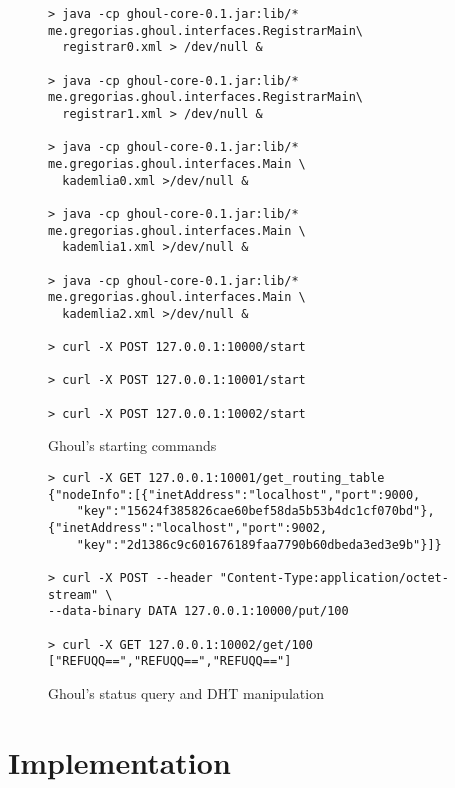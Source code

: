 \begin{figure}[tbp]
\begin{verbatim}
> java -cp ghoul-core-0.1.jar:lib/* me.gregorias.ghoul.interfaces.RegistrarMain\
  registrar0.xml > /dev/null &

> java -cp ghoul-core-0.1.jar:lib/* me.gregorias.ghoul.interfaces.RegistrarMain\
  registrar1.xml > /dev/null &

> java -cp ghoul-core-0.1.jar:lib/* me.gregorias.ghoul.interfaces.Main \ 
  kademlia0.xml >/dev/null &

> java -cp ghoul-core-0.1.jar:lib/* me.gregorias.ghoul.interfaces.Main \ 
  kademlia1.xml >/dev/null &

> java -cp ghoul-core-0.1.jar:lib/* me.gregorias.ghoul.interfaces.Main \ 
  kademlia2.xml >/dev/null &

> curl -X POST 127.0.0.1:10000/start

> curl -X POST 127.0.0.1:10001/start

> curl -X POST 127.0.0.1:10002/start
\end{verbatim}
\caption{Ghoul's starting commands}
\label{fig:ghoul_manual_run}
\end{figure}

\begin{figure}[tbp]
\begin{verbatim}
> curl -X GET 127.0.0.1:10001/get_routing_table
{"nodeInfo":[{"inetAddress":"localhost","port":9000,
    "key":"15624f385826cae60bef58da5b53b4dc1cf070bd"},
{"inetAddress":"localhost","port":9002,
    "key":"2d1386c9c601676189faa7790b60dbeda3ed3e9b"}]}

> curl -X POST --header "Content-Type:application/octet-stream" \ 
--data-binary DATA 127.0.0.1:10000/put/100

> curl -X GET 127.0.0.1:10002/get/100
["REFUQQ==","REFUQQ==","REFUQQ=="]
\end{verbatim}
\caption{Ghoul's status query and DHT manipulation}
\label{fig:ghoul_manipulation}
\end{figure}

\section{Implementation}
\label{sec:implementation}

